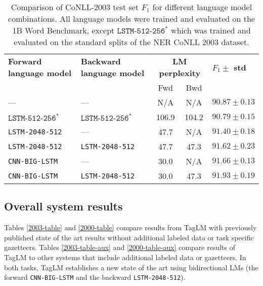 \documentclass[11pt,a4paper]{article}
\begin{document}
\begin{table*}[t]
\begin{center}
\begin{tabular}{l|l||c|c||l}
\hline \hline
\bf Forward language model &\bf Backward language model & \multicolumn{2}{c||}{\bf LM perplexity} & \bf $F_1 \pm$ std \\
&& Fwd & Bwd & \\ \hline
--- & --- & N/A & N/A & $90.87 \pm 0.13$ \\ \hline
$\texttt{LSTM-512-256}^*$ & $\texttt{LSTM-512-256}^*$ & 106.9 & 104.2 & $90.79 \pm 0.15$ \\ \hline
\texttt{LSTM-2048-512} & --- & 47.7 & N/A & $91.40 \pm 0.18$ \\
\texttt{LSTM-2048-512} & \texttt{LSTM-2048-512} & 47.7 & 47.3 & $91.62 \pm 0.23$ \\ \hline
\texttt{CNN-BIG-LSTM} & --- & 30.0 & N/A & $91.66 \pm 0.13$ \\
\texttt{CNN-BIG-LSTM} & \texttt{LSTM-2048-512} & 30.0 & 47.3 & $\mathbf{91.93 \pm 0.19}$ \\
\hline \hline
\end{tabular}
\end{center}
\caption{\label{2003-table-lm-size} Comparison of CoNLL-2003 test set $F_1$ for different language model combinations.  All language models were trained and evaluated on the 1B Word Benchmark, except $\texttt{LSTM-512-256}^*$ which was trained and evaluated on the standard splits of the NER CoNLL 2003 dataset.}
\end{table*}




\subsection{Overall system results}
\label{sec:overall_system_results}

Tables \ref{2003-table} and \ref{2000-table} compare results from TagLM with
previously published state of the art results without additional labeled data or task specific gazetteers.  Tables \ref{2003-table-aux} and \ref{2000-table-aux} compare results of TagLM to other systems that include additional labeled data or gazetteers.
In both tasks, TagLM establishes a new state of the art using bidirectional LMs (the forward \texttt{CNN-BIG-LSTM} and the backward \texttt{LSTM-2048-512}).
\end{document}
